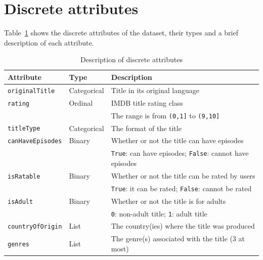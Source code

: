 \section{Discrete attributes}
Table~\ref{tab:attributes} shows the discrete attributes of the dataset,
their types and a brief description of each attribute.
\begin{table}[h]
    \centering
    \begin{tabular}{|l|l|l|} %
        \hline
        \textbf{Attribute} & \textbf{Type} & \textbf{Description} \\ 
        \hline
        \texttt{originalTitle} & Categorical & Title in its original language \\  
        \hline
        \texttt{rating} & Ordinal & IMDB title rating class \\
        & & The range is from \texttt{(0,1]} to \texttt{(9,10]} \\ 
        \hline
        \texttt{titleType} & Categorical & The format of the title \\ 
        \hline
        \texttt{canHaveEpisodes} & Binary & Whether or not the title can have episodes \\ 
        & & \texttt{True}: can have episodes; \texttt{False}: cannot have episodes \\ 
        \hline
        \texttt{isRatable} & Binary & Whether or not the title can be rated by users \\ 
        & & \texttt{True}: it can be rated; \texttt{False}: cannot be rated \\ 
        \hline
        \texttt{isAdult} & Binary & Whether or not the title is for adults \\ 
        & & \texttt{0}: non-adult title; \texttt{1}: adult title \\ 
        \hline
        \texttt{countryOfOrigin} & List & The country(ies) where the title was produced \\ 
        \hline
        \texttt{genres} & List & The genre(s) associated with the title (3 at most) \\ 
        \hline
    \end{tabular}
    \caption{Description of discrete attributes}
    \label{tab:attributes}
\end{table}

